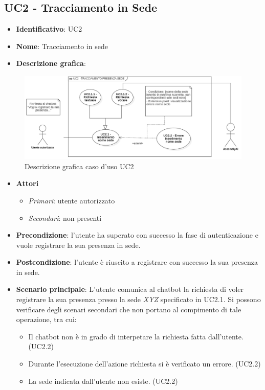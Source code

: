 \subsection{UC2 - Tracciamento  in Sede}
\begin{itemize}
    \item \textbf{Identificativo}: UC2
    \item \textbf{Nome}: Tracciamento  in sede
    \item \textbf{Descrizione grafica}:
\end{itemize}

\begin{figure}[h]
    \centering
    \includegraphics[scale=0.50]{images/UC2.png} 
    \caption{Descrizione grafica caso d'uso UC2}
\end{figure}

\begin{itemize}
    \item \textbf{Attori}
 \begin{itemize} 
    \item \textit{Primari}: utente autorizzato
    \item \textit{Secondari}: non presenti
 \end{itemize}
 \item \textbf{Precondizione}: l'utente ha superato con successo la fase di autenticazione e vuole registrare la sua presenza in sede. 
 \item \textbf{Postcondizione}: l'utente è riuscito a registrare con successo la sua presenza in sede. 
 \item \textbf{Scenario principale}: L'utente comunica al chatbot la richiesta di voler registrare la sua presenza presso la sede \textit{XYZ} specificato in UC2.1. Si possono verificare degli scenari secondari che non portano al compimento di tale operazione, tra cui:
    \begin{itemize}
        \item Il chatbot non è in grado di interpetare la richiesta fatta dall'utente. (UC2.2)
        \item Durante l'esecuzione dell'azione richiesta si è verificato un errore. (UC2.2)
        \item La sede indicata dall'utente non esiste. (UC2.2)
    \end{itemize}
\end{itemize}
\newpage

